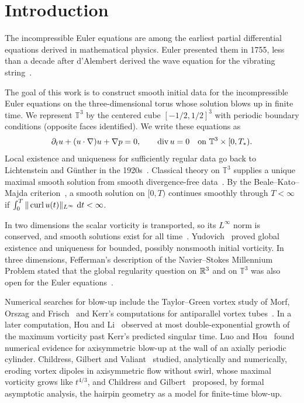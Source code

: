 \section{Introduction}\label{cc:sec:problem}

The incompressible Euler equations are among the earliest partial
differential equations derived in mathematical physics. Euler presented them in
1755, less than a decade after d'Alembert derived the wave equation for
the vibrating string~\cite{DAlembert1747,Euler1757}.

The goal of this work is to construct smooth initial data for the
incompressible Euler equations on the three-dimensional torus whose
solution blows up in finite time. We represent $\mathbb T^3$ by the
centered cube $[-1/2,1/2]^3$ with periodic boundary conditions
(opposite faces identified). We write these equations as
\begin{equation}\label{cc:eq:euler}
 \partial_tu+(u\cdot\nabla)u+\nabla p=0,
 \qquad \operatorname{div} u=0
 \quad\hbox{on }\mathbb T^3\times[0,T_*).
\end{equation}
Local existence and uniqueness for sufficiently regular data go back to
Lichtenstein and G\"unther in the 1920s~\cite{Lichtenstein1925,Gunther1926}.
Classical theory on $\mathbb T^3$ supplies a unique maximal smooth solution
from smooth divergence-free data~\cite{EbinMarsden,BedrossianVicol}.
By the Beale--Kato--Majda criterion~\cite{BKM,GGPP}, a smooth solution on
$[0,T)$ continues smoothly through $T<\infty$ if
$\int_0^T\|\operatorname{curl} u(t)\|_{L^\infty}\,\,\mathrm d t<\infty$.

In two dimensions the scalar vorticity is transported, so its
$L^\infty$ norm is conserved, and smooth solutions exist for all
time~\cite{Wolibner1933}. Yudovich~\cite{Yudovich1963} proved global
existence and uniqueness for bounded, possibly nonsmooth initial
vorticity. In three dimensions, Fefferman's description of the
Navier--Stokes Millennium Problem stated that the global regularity
question on $\mathbb R^3$ and on $\mathbb T^3$ was also open for the Euler
equations~\cite{Fefferman2006}.

Numerical searches for blow-up include the Taylor--Green vortex study
of Morf, Orszag and Frisch~\cite{MorfOrszagFrisch1980} and Kerr's
computations for antiparallel vortex tubes~\cite{Kerr1993}.
In a later computation, Hou and Li~\cite{HouLi2006} observed at most
double-exponential growth of the maximum vorticity past Kerr's predicted
singular time.
Luo and Hou~\cite{LuoHou2014} found numerical evidence for axisymmetric
blow-up at the wall of an axially periodic cylinder.
Childress, Gilbert and Valiant~\cite{ChildressGilbertValiant2016}
studied, analytically and numerically, eroding vortex dipoles in
axisymmetric flow without swirl, whose maximal vorticity grows like
$t^{4/3}$, and Childress and Gilbert~\cite{ChildressGilbert2018}
proposed, by formal asymptotic analysis, the hairpin geometry as a model
for finite-time blow-up.

